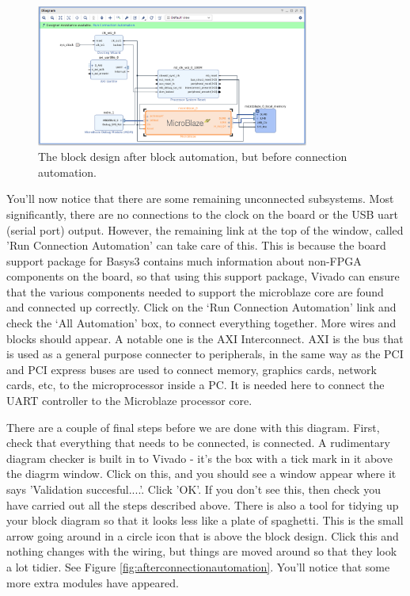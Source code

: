 \documentclass[../physical_computing.tex]{subfiles}
\begin{document}
\begin{figure}[h!]
    \centering
    \includegraphics[width=0.8\textwidth]{appendix_8/figures/afterblockautomation.png}
    \caption{The block design after block automation, but before connection automation.}
    \label{fig:afterblockautomation}
\end{figure}

You'll now notice that there are some remaining unconnected subsystems. Most significantly, there are no connections to the clock on the 
board or the USB uart (serial port) output. However, the remaining link at the top of the window, called 'Run Connection Automation' can
take care of this. This is because the board support package for Basys3 contains much information about non-FPGA components on the board, 
so that using this support package, Vivado can ensure that the various components needed to support the microblaze core are found
and connected up correctly. Click on the `Run Connection Automation' link and check the `All Automation' box, to connect everything together.
More wires and blocks should appear. A notable one is the AXI Interconnect. AXI is the bus that is used as a general purpose connecter to peripherals, in 
the same way as the PCI and PCI express buses are used to connect memory, graphics cards, network cards, etc, to the microprocessor inside 
a PC. It is needed here to connect the UART controller to the Microblaze processor core.

There are a couple of final steps before we are done with this diagram. First, check that everything that needs to be connected, is connected.
A rudimentary diagram checker is built in to Vivado - it's the box with a tick mark in it above the diagrm window. Click on this, and you should
see a window appear where it says 'Validation succesful....'. Click 'OK'. If you don't  see this, then check you have carried out all the 
steps described above. There is also a tool for tidying up your block diagram so that it looks less like a plate of spaghetti. This is
the small arrow going around in a circle icon that is above the block design. Click this and nothing changes with the wiring, but things
are moved around so that they look a lot tidier. See Figure \ref{fig:afterconnectionautomation}. You'll notice that some more extra
modules have appeared. 
\end{document}
